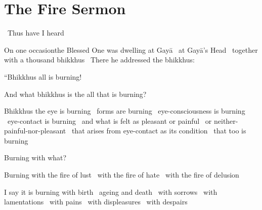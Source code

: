 \section{The Fire Sermon}
\label{fire-sermon}

\begin{leader-english}
  \anglebracketleft\ \hspace{-0.5mm}Thus have I heard \hspace{-0.5mm}\anglebracketright\
\end{leader-english}

\begin{english-only-hang}
  On one occasion\makeatletter\hyperlink{endnote113-appendix}\makeatother\thinspace the Blessed One was dwelling at Gayā \breathmark\ at Gayā's Head \breathmark\ together with a thousand bhikkhus \breathmark\ There he addressed the bhikkhus:
\end{english-only-hang}

\begin{english-only-hang}
  ``Bhikkhus all is burning!
\end{english-only-hang}

\begin{english-only-hang}
  And what bhikkhus is the all that is burning?
\end{english-only-hang}

\begin{english-only-hang}
  Bhikkhus the eye is burning \breathmark\ forms are burning \breathmark\ eye-consciousness is burning \breathmark\ eye-contact is burning \breathmark\ and what is felt as pleasant or painful \breathmark\ or neither-painful-nor-pleasant \breathmark\ that arises from eye-contact as its condition \breathmark\ that too is burning
\end{english-only-hang}
\begin{english-only-hangtogether}
  Burning with what?
\end{english-only-hangtogether}
\begin{english-only-hangtogether}
  Burning with the fire of lust \breathmark\ with the fire of hate \breathmark\ with the fire of delusion
\end{english-only-hangtogether}
\begin{english-only-hangtogether}
  I say it is burning with birth \breathmark\ ageing and death \breathmark\ with sorrows \breathmark\ with lamentations \breathmark\ with pains \breathmark\ with displeasures \breathmark\ with despairs
\end{english-only-hangtogether}

